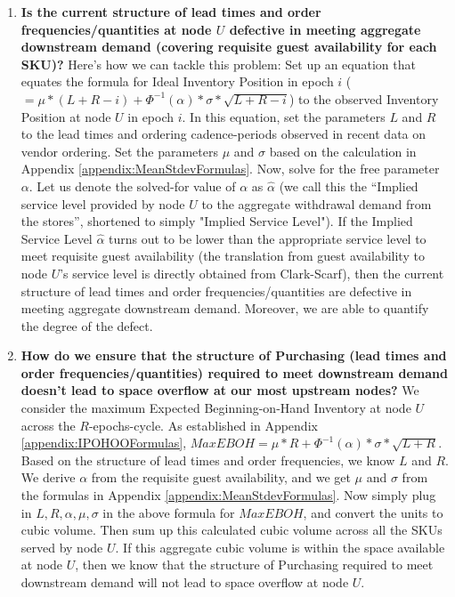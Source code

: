\documentclass[11pt]{amsart}
\begin{document}
\begin{enumerate}

\item {\bf Is the current structure of lead times and order frequencies/quantities at node $U$ defective in meeting aggregate downstream demand (covering requisite guest availability for each SKU)?} Here's how we can tackle this problem: Set up an equation that equates the formula for Ideal Inventory Position in epoch $i$ ($ = \mu * (L + R - i) + \Phi^{-1}(\alpha) * \sigma * \sqrt{L+R-i}$) to the observed Inventory Position at node $U$ in epoch $i$. In this equation, set the parameters $L$ and $R$ to the lead times and ordering cadence-periods observed in recent data on vendor ordering. Set the parameters $\mu$ and $\sigma$ based on the calculation in Appendix \ref{appendix:MeanStdevFormulas}. Now, solve for the free parameter $\alpha$. Let us denote the solved-for value of $\alpha$ as $\hat{\alpha}$ (we call this the ``Implied service level provided by node $U$ to the aggregate withdrawal demand from the stores'', shortened to simply "Implied Service Level"). If the Implied Service Level $\hat{\alpha}$ turns out to be lower than the appropriate service level to meet requisite guest availability (the translation from guest availability to node $U$'s service level is directly obtained from Clark-Scarf), then the current structure of lead times and order frequencies/quantities are defective in meeting aggregate downstream demand. Moreover, we are able to quantify the degree of the defect.

\item {\bf How do we ensure that the structure of Purchasing (lead times and order frequencies/quantities) required to meet downstream demand doesn't lead to space overflow at our most upstream nodes?} We consider the maximum Expected Beginning-on-Hand Inventory at node $U$ across the $R$-epochs-cycle. As established in Appendix \ref{appendix:IPOHOOFormulas}, $Max EBOH =  \mu * R + \Phi^{-1}(\alpha) * \sigma * \sqrt{L+R}$. Based on the structure of lead times and order frequencies, we know $L$ and $R$. We derive $\alpha$ from the requisite guest availability, and we get $\mu$ and $\sigma$ from the formulas in Appendix \ref{appendix:MeanStdevFormulas}. Now simply plug in $L, R, \alpha, \mu, \sigma$ in the above formula for $ Max EBOH$, and convert the units to cubic volume. Then sum up this calculated cubic volume across all the SKUs served by node $U$. If this aggregate cubic volume is within the space available at node $U$, then we know that the structure of Purchasing required to meet downstream demand will not lead to space overflow at node $U$.

\end{enumerate}
\end{document}
